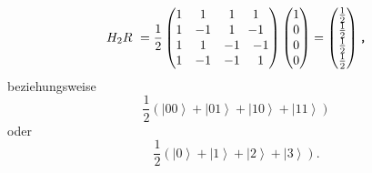 \begin{equation}
    H_2R\ =\frac{1}{2}\left(\begin{matrix}\begin{matrix}1&1\\1&-1\\\end{matrix}&\begin{matrix}1&1\\1&-1\\\end{matrix}\\\begin{matrix}1&1\\1&-1\\\end{matrix}&\begin{matrix}-1&-1\\-1&1\\\end{matrix}\\\end{matrix}\right)\left(\begin{matrix}1\\\begin{matrix}0\\\begin{matrix}0\\0\\\end{matrix}\\\end{matrix}\\\end{matrix}\right)=\left(\begin{matrix}\frac{1}{2}\\\frac{1}{2}\\\frac{1}{2}\\\frac{1}{2}\\\end{matrix}\right)\verb|,|
\end{equation}
beziehungsweise 
\begin{equation}
    \frac{1}{2}\left(\left|\left.00\right\rangle\right.+\left|\left.01\right\rangle\right.+\left|\left.10\right\rangle\right.+\left|\left.11\right\rangle\right.\right)
\end{equation}
    oder
\begin{equation}
    \frac{1}{2}\left(\left|\left.0\right\rangle\right.+\left|\left.1\right\rangle\right.+\left|\left.2\right\rangle\right.+\left|\left.3\right\rangle\right.\right).
\end{equation}
